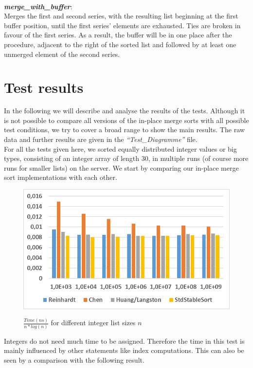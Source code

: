 \documentclass[11pt,pdftex,a4paper, twocolumn]{article}
\begin{document}
$ $ \\
\textbf{\textit{merge\_with\_buffer}}: \\
Merges the first and second series, with the resulting list beginning at the first buffer position, until the first series’ elements are exhausted. Ties are broken in favour of the first series. As a result, the buffer will be in one place after the procedure, adjacent to the right of the sorted list and followed by at least one unmerged element of the second series.

\section*{Test results}
In the following we will describe and analyse the results of the tests. Although it is not possible to compare all versions of the in-place merge sorts with all possible test conditions, we try to cover a broad range to show the main results. The raw data and further results are given in the \textit{“Test\_Diagramme”} file. \\
For all the tests given here, we sorted equally distributed integer values or big types, consisting of an integer array of length 30, in multiple runs (of course more runs for smaller lists) on the server. We start by comparing our in-place merge sort implementations with each other. \\
\begin{figure}[H]
\includegraphics[width=\linewidth]{Diagramm-Bilder/ints-time.JPG} \\
\caption{ $ \frac{Time(ns)}{n*log(n)} $ for different integer list sizes $ n $ } \label{fig:ints-time}
\end{figure}
Integers do not need much time to be assigned. Therefore the time in this test is mainly influenced by other statements like index computations. This can also be seen by a comparison with the following result. \\
\end{document}
